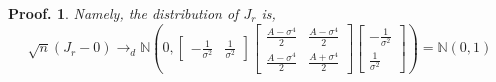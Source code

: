 \documentclass{article}
\theoremstyle{break}
\newtheorem*{proof_break}{Proof.}
\begin{document}
\begin{proof_break}
        \newline
        Namely, the distribution of $J_r$ is,
        $$\sqrt{n}\left(J_{r}-0\right) \rightarrow_{d} \mathbb{N}\left(0,\left[\begin{array}{cc}{-\frac{1}{\sigma^{2}}} & {\frac{1}{\sigma^{2}}}\end{array}\right]\left[\begin{array}{cc}{\frac{A-\sigma^{4}}{2}} & {\frac{A-\sigma^{4}}{2}} \\ {\frac{A-\sigma^{4}}{2}} & {\frac{A+\sigma^{4}}{2}}\end{array}\right]\left[\begin{array}{c}{-\frac{1}{\sigma^{2}}} \\ {\frac{1}{\sigma^{2}}}\end{array}\right]\right)=\mathbb{N}(0,1)$$
    \end{proof_break}
    
\end{document}
